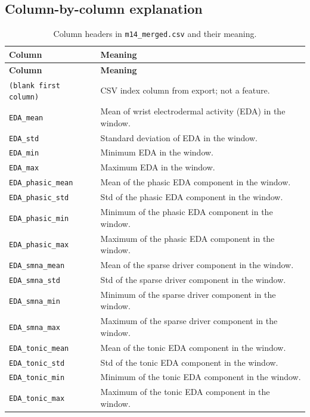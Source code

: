 \documentclass[11pt]{article}
\begin{document}
\subsection{Column-by-column explanation}
\renewcommand{\arraystretch}{1.1}
\begin{longtable}{@{}p{}p{}@{}}
\caption{\label{tab:columns}Column headers in \texttt{m14\_merged.csv} and their meaning.}\\
\toprule
\textbf{Column} & \textbf{Meaning} \\
\midrule
\endfirsthead
\toprule
\textbf{Column} & \textbf{Meaning} \\
\midrule
\endhead
\bottomrule
\endfoot

\texttt{(blank first column)} & CSV index column from export; not a feature. \\

\texttt{EDA\_mean} & Mean of wrist electrodermal activity (EDA) in the window. \\
\texttt{EDA\_std} & Standard deviation of EDA in the window. \\
\texttt{EDA\_min} & Minimum EDA in the window. \\
\texttt{EDA\_max} & Maximum EDA in the window. \\

\texttt{EDA\_phasic\_mean} & Mean of the phasic EDA component in the window. \\
\texttt{EDA\_phasic\_std} & Std of the phasic EDA component in the window. \\
\texttt{EDA\_phasic\_min} & Minimum of the phasic EDA component in the window. \\
\texttt{EDA\_phasic\_max} & Maximum of the phasic EDA component in the window. \\

\texttt{EDA\_smna\_mean} & Mean of the sparse driver component in the window. \\
\texttt{EDA\_smna\_std} & Std of the sparse driver component in the window. \\
\texttt{EDA\_smna\_min} & Minimum of the sparse driver component in the window. \\
\texttt{EDA\_smna\_max} & Maximum of the sparse driver component in the window. \\

\texttt{EDA\_tonic\_mean} & Mean of the tonic EDA component in the window. \\
\texttt{EDA\_tonic\_std} & Std of the tonic EDA component in the window. \\
\texttt{EDA\_tonic\_min} & Minimum of the tonic EDA component in the window. \\
\texttt{EDA\_tonic\_max} & Maximum of the tonic EDA component in the window. \\


\end{longtable}
\end{document}
